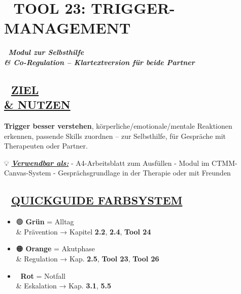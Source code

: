\hypertarget{tool-23-trigger-management}{%
\section{\texorpdfstring{📄 \textbf{TOOL 23: TRIGGER-MANAGEMENT}}{📄 TOOL 23: TRIGGER-MANAGEMENT}\label{tool-23-trigger-management}}

🧩 \emph{\textbf{Modul zur Selbsthilfe \\\& Co-Regulation -- Klartextversion für beide Partner}}

\hypertarget{ziel-nutzen}{%
\subsection{\texorpdfstring{🎯 \textbf{\ul{ZIEL \\\& NUTZEN}}}{🎯 ZIEL \\\& NUTZEN}\label{ziel-nutzen}}

\textbf{Trigger besser verstehen}, körperliche/emotionale/mentale Reaktionen erkennen, passende Skills zuordnen -- zur Selbsthilfe, für Gespräche mit Therapeuten oder Partner.

💡 \emph{\textbf{\ul{Verwendbar als:}}} - A4-Arbeitsblatt zum Ausfüllen - Modul im CTMM-Canvas-System - Gesprächsgrundlage in der Therapie oder mit Freunden

\hypertarget{section}{%
\subsection{}\label{section}}

\hypertarget{quickguide-farbsystem}{%
\subsection{\texorpdfstring{🧭 \textbf{\ul{QUICKGUIDE FARBSYSTEM}}}{🧭 QUICKGUIDE FARBSYSTEM}\label{quickguide-farbsystem}}

\begin{itemize}
\tightlist
\item
  🟢 \textbf{Grün} = Alltag \\\& Prävention → Kapitel \textbf{2.2}, \textbf{2.4}, \textbf{Tool 24}
\item
  🟠 \textbf{Orange} = Akutphase \\\& Regulation → Kap. \textbf{2.5}, \textbf{Tool 23}, \textbf{Tool 26}
\item
  🔴 \textbf{Rot} = Notfall \\\& Eskalation → Kap. \textbf{3.1}, \textbf{5.5}
\end{itemize}

}}}
